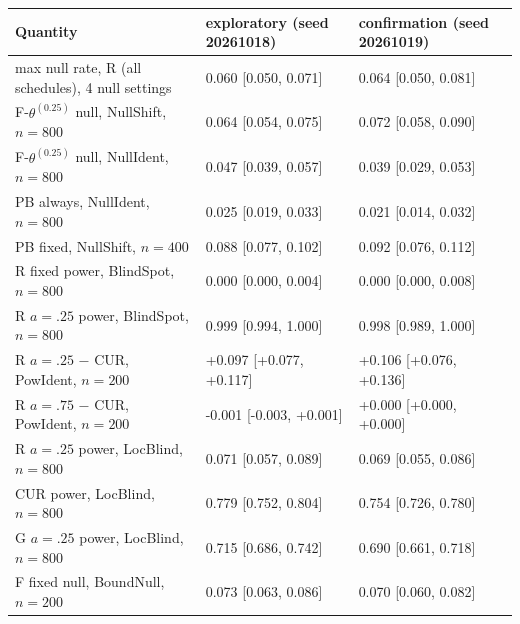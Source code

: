 \begin{tabular}{@{}lll@{}}
\toprule
Quantity & exploratory (seed 20261018) & confirmation (seed 20261019)\\
\midrule
max null rate, R (all schedules), 4 null settings & 0.060 [0.050, 0.071] & 0.064 [0.050, 0.081]\\
F-$\theta^{(0.25)}$ null, NullShift, $n=800$ & 0.064 [0.054, 0.075] & 0.072 [0.058, 0.090]\\
F-$\theta^{(0.25)}$ null, NullIdent, $n=800$ & 0.047 [0.039, 0.057] & 0.039 [0.029, 0.053]\\
PB always, NullIdent, $n=800$ & 0.025 [0.019, 0.033] & 0.021 [0.014, 0.032]\\
PB fixed, NullShift, $n=400$ & 0.088 [0.077, 0.102] & 0.092 [0.076, 0.112]\\
R fixed power, BlindSpot, $n=800$ & 0.000 [0.000, 0.004] & 0.000 [0.000, 0.008]\\
R $a=.25$ power, BlindSpot, $n=800$ & 0.999 [0.994, 1.000] & 0.998 [0.989, 1.000]\\
R $a=.25$ $-$ CUR, PowIdent, $n=200$ & +0.097 [+0.077, +0.117] & +0.106 [+0.076, +0.136]\\
R $a=.75$ $-$ CUR, PowIdent, $n=200$ & -0.001 [-0.003, +0.001] & +0.000 [+0.000, +0.000]\\
R $a=.25$ power, LocBlind, $n=800$ & 0.071 [0.057, 0.089] & 0.069 [0.055, 0.086]\\
CUR power, LocBlind, $n=800$ & 0.779 [0.752, 0.804] & 0.754 [0.726, 0.780]\\
G $a=.25$ power, LocBlind, $n=800$ & 0.715 [0.686, 0.742] & 0.690 [0.661, 0.718]\\
F fixed null, BoundNull, $n=200$ & 0.073 [0.063, 0.086] & 0.070 [0.060, 0.082]\\
\bottomrule
\end{tabular}